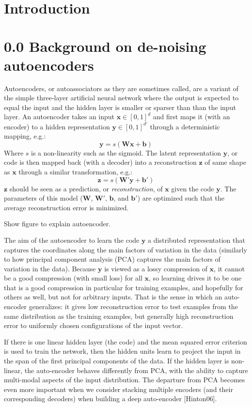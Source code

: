 \documentclass[11pt]{article}
\begin{document}
         
\section{Introduction}
\label{Introduction}

\section{0.0 Background on de-noising autoencoders}
\label{Background on de-noising autoencoders}
Autoencoders, or autoassociators as they are sometimes called, are a variant of the simple three-layer artificial neural network where the output is expected to equal the input and the hidden layer is smaller or sparser than than the input layer. An autoencoder takes an input $\mathbf x\in[0,1]^d$ and first maps it (with an encoder) to a hidden representation $\mathbf y\in[0,1]^{d'}$ through a deterministic mapping, e.g.:
\[
\mathbf y = s(\mathbf W\mathbf x + \mathbf b)
\]
Where $s$ is a non-linearity such as the sigmoid. The latent representation $\mathbf y$, or code is then mapped back (with a decoder) into a reconstruction $\mathbf z$ of same shape as $\mathbf x$  through a similar transformation, e.g.:
\[
\mathbf z = s(\mathbf W'\mathbf y + \mathbf b')
\]
$\mathbf z$ should be seen as a prediction, or {\it reconstruction}, of  $\mathbf x$ given the code  $\mathbf y$. The parameters of this model ($\mathbf W$, $\mathbf W'$, $\mathbf b$, and $\mathbf b'$) are optimized such that the average reconstruction error is minimized.

Show figure to explain autoencoder.

The aim of the autoencoder to learn the code $\mathbf y$ a distributed representation that captures the coordinates along the main factors of variation in the data (similarly to how principal component analysis (PCA) captures the main factors of variation in the data). Because $\mathbf y$ is viewed as a lossy compression of $\mathbf x$, it cannot be a good compression (with small loss) for all $\mathbf x$, so learning drives it to be one that is a good compression in particular for training examples, and hopefully for others as well, but not for arbitrary inputs. That is the sense in which an auto-encoder generalizes: it gives low reconstruction error to test examples from the same distribution as the training examples, but generally high reconstruction error to uniformly chosen configurations of the input vector.

If there is one linear hidden layer (the code) and the mean squared error criterion is used to train the network, then the  hidden units learn to project the input in the span of the first  principal components of the data. If the hidden layer is non-linear, the auto-encoder behaves differently from PCA, with the ability to capture multi-modal aspects of the input distribution. The departure from PCA becomes even more important when we consider stacking multiple encoders (and their corresponding decoders) when building a deep auto-encoder [Hinton06].
\end{document}
